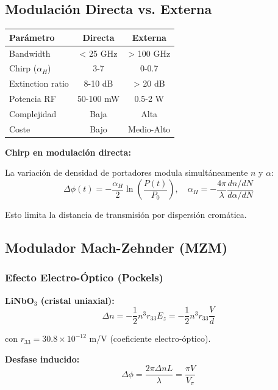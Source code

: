 \documentclass[11pt,a4paper]{article}
\begin{document}
\subsection{Modulación Directa vs. Externa}

\begin{table}[h]
\centering
\begin{tabular}{lcc}
\hline
\textbf{Parámetro} & \textbf{Directa} & \textbf{Externa} \\
\hline
Bandwidth & < 25 GHz & > 100 GHz \\
Chirp ($\alpha_H$) & 3-7 & 0-0.7 \\
Extinction ratio & 8-10 dB & > 20 dB \\
Potencia RF & 50-100 mW & 0.5-2 W \\
Complejidad & Baja & Alta \\
Coste & Bajo & Medio-Alto \\
\hline
\end{tabular}
\end{table}

\textbf{Chirp en modulación directa:}

La variación de densidad de portadores modula simultáneamente $n$ y $\alpha$:
\begin{equation}
    \Delta\phi(t) = -\frac{\alpha_H}{2}\ln\left(\frac{P(t)}{P_0}\right), \quad \alpha_H = -\frac{4\pi}{\lambda}\frac{dn/dN}{d\alpha/dN}
\end{equation}

Esto limita la distancia de transmisión por dispersión cromática.

\subsection{Modulador Mach-Zehnder (MZM)}

\subsubsection{Efecto Electro-Óptico (Pockels)}

\textbf{LiNbO$_3$ (cristal uniaxial):}
\begin{equation}
    \Delta n = -\frac{1}{2}n^3 r_{33} E_z = -\frac{1}{2}n^3 r_{33}\frac{V}{d}
\end{equation}

con $r_{33} = 30.8 \times 10^{-12}$ m/V (coeficiente electro-óptico).

\textbf{Desfase inducido:}
\begin{equation}
    \Delta\phi = \frac{2\pi\Delta n L}{\lambda} = \frac{\pi V}{V_\pi}
\end{equation}
\end{document}
